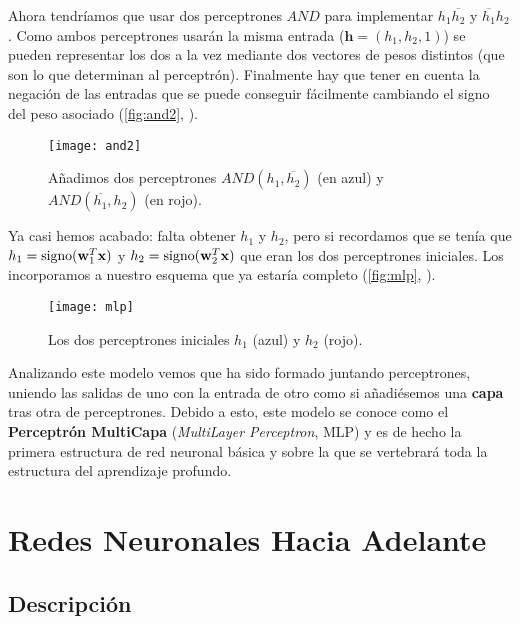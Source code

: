 Ahora tendríamos que usar dos perceptrones $AND$ para implementar $h_1\overline{h_2}$ y $\overline{h_1}h_2$. Como ambos perceptrones usarán la misma entrada ($\textbf{h} = (h_1, h_2, 1)$) se pueden representar los dos a la vez mediante dos vectores de pesos distintos (que son lo que determinan al perceptrón). Finalmente hay que tener en cuenta la negación de las entradas que se puede conseguir fácilmente cambiando el signo del peso asociado (\autoref{fig:and2}, \cite{abu2012learning}).

\begin{figure}[htpb]
  \centering
  \texttt{[image: and2]}
  \caption{Añadimos dos perceptrones $AND(h_1, \overline{h_2})$ (en azul) y $AND(\overline{h_1}, h_2)$ (en rojo).}
  \label{fig:and2}
\end{figure}

Ya casi hemos acabado: falta obtener $h_1$ y $h_2$, pero si recordamos que se tenía que $h_1 = \operatorname{signo}(\textbf{w}^T_1 \textbf{x})$ y $h_2 = \operatorname{signo}(\textbf{w}^T_2 \textbf{x})$ que eran los dos perceptrones iniciales. Los incorporamos a nuestro esquema que ya estaría completo (\autoref{fig:mlp}, \cite{abu2012learning}).

\begin{figure}[htpb]
  \centering
  \texttt{[image: mlp]}
  \caption{Los dos perceptrones iniciales $h_1$ (azul) y $h_2$ (rojo).}
  \label{fig:mlp}
\end{figure}

Analizando este modelo vemos que ha sido formado juntando perceptrones, uniendo las salidas de uno con la entrada de otro como si añadiésemos una \textbf{capa} tras otra de perceptrones. Debido a esto, este modelo se conoce como el \textbf{Perceptrón MultiCapa} (\emph{MultiLayer Perceptron}, MLP) \cite{rumelhart1985learning} y es de hecho la primera estructura de red neuronal básica y sobre la que se vertebrará toda la estructura del aprendizaje profundo.

\section{Redes Neuronales Hacia Adelante}

\subsection{Descripción}

